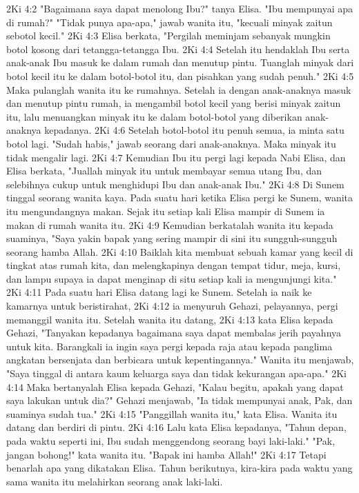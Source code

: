 2Ki 4:2  "Bagaimana saya dapat menolong Ibu?" tanya Elisa. "Ibu mempunyai apa di rumah?" "Tidak punya apa-apa," jawab wanita itu, "kecuali minyak zaitun sebotol kecil."
2Ki 4:3  Elisa berkata, "Pergilah meminjam sebanyak mungkin botol kosong dari tetangga-tetangga Ibu.
2Ki 4:4  Setelah itu hendaklah Ibu serta anak-anak Ibu masuk ke dalam rumah dan menutup pintu. Tuanglah minyak dari botol kecil itu ke dalam botol-botol itu, dan pisahkan yang sudah penuh."
2Ki 4:5  Maka pulanglah wanita itu ke rumahnya. Setelah ia dengan anak-anaknya masuk dan menutup pintu rumah, ia mengambil botol kecil yang berisi minyak zaitun itu, lalu menuangkan minyak itu ke dalam botol-botol yang diberikan anak-anaknya kepadanya.
2Ki 4:6  Setelah botol-botol itu penuh semua, ia minta satu botol lagi. "Sudah habis," jawab seorang dari anak-anaknya. Maka minyak itu tidak mengalir lagi.
2Ki 4:7  Kemudian Ibu itu pergi lagi kepada Nabi Elisa, dan Elisa berkata, "Juallah minyak itu untuk membayar semua utang Ibu, dan selebihnya cukup untuk menghidupi Ibu dan anak-anak Ibu."
2Ki 4:8  Di Sunem tinggal seorang wanita kaya. Pada suatu hari ketika Elisa pergi ke Sunem, wanita itu mengundangnya makan. Sejak itu setiap kali Elisa mampir di Sunem ia makan di rumah wanita itu.
2Ki 4:9  Kemudian berkatalah wanita itu kepada suaminya, "Saya yakin bapak yang sering mampir di sini itu sungguh-sungguh seorang hamba Allah.
2Ki 4:10  Baiklah kita membuat sebuah kamar yang kecil di tingkat atas rumah kita, dan melengkapinya dengan tempat tidur, meja, kursi, dan lampu supaya ia dapat menginap di situ setiap kali ia mengunjungi kita."
2Ki 4:11  Pada suatu hari Elisa datang lagi ke Sunem. Setelah ia naik ke kamarnya untuk beristirahat,
2Ki 4:12  ia menyuruh Gehazi, pelayannya, pergi memanggil wanita itu. Setelah wanita itu datang,
2Ki 4:13  kata Elisa kepada Gehazi, "Tanyakan kepadanya bagaimana saya dapat membalas jerih payahnya untuk kita. Barangkali ia ingin saya pergi kepada raja atau kepada panglima angkatan bersenjata dan berbicara untuk kepentingannya." Wanita itu menjawab, "Saya tinggal di antara kaum keluarga saya dan tidak kekurangan apa-apa."
2Ki 4:14  Maka bertanyalah Elisa kepada Gehazi, "Kalau begitu, apakah yang dapat saya lakukan untuk dia?" Gehazi menjawab, "Ia tidak mempunyai anak, Pak, dan suaminya sudah tua."
2Ki 4:15  "Panggillah wanita itu," kata Elisa. Wanita itu datang dan berdiri di pintu.
2Ki 4:16  Lalu kata Elisa kepadanya, "Tahun depan, pada waktu seperti ini, Ibu sudah menggendong seorang bayi laki-laki." "Pak, jangan bohong!" kata wanita itu. "Bapak ini hamba Allah!"
2Ki 4:17  Tetapi benarlah apa yang dikatakan Elisa. Tahun berikutnya, kira-kira pada waktu yang sama wanita itu melahirkan seorang anak laki-laki.
